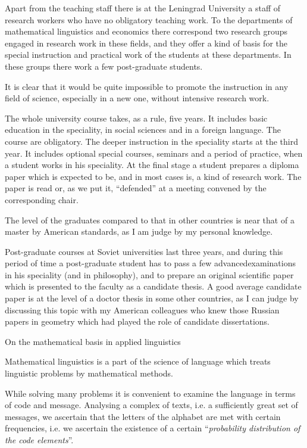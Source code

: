 Apart from the teaching staff there is at the Leningrad University a
staff of research workers who have no obligatory teaching work. To the
departments of mathematical linguistics and economics there correspond
two research groups engaged in research work in these fields, and they
offer a kind of basis for the special instruction and practical work
of the students at these departments. In these groups there work a few
post-graduate students.

It is clear that it would be quite impossible to promote the
instruction in any field of science, especially in a new one, without
intensive research work.

The whole university course takes, as a rule, five  years. It includes
basic education in the speciality, in social sciences and in a foreign
language. The course are obligatory. The deeper instruction in the
speciality starts at the third year. It includes optional special
courses, seminars and a period of practice, when a student works in
his speciality. At the final stage a student prepares a diploma paper
which is expected to be, and in most cases is, a kind of research
work. The paper is read or, as we put it, ``defended'' at a meeting
convened by the corresponding chair.

The level of the graduates compared to that in other countries is near
that of a master by American standards, as I am judge by my personal
knowledge.

Post-graduate courses at Soviet universities last three years, and
during this period of time a post-graduate student has to pass a few
advanced\pageoriginale examinations in his speciality (and in
philosophy), and to prepare an original scientific paper which is
presented to the faculty as a candidate thesis. A good average
candidate paper is at the level of a doctor thesis in some other
countries, as I can judge by discussing this topic with my American
colleagues who knew those Russian papers in geometry which had played
the role of candidate dissertations.

\begin{center}
On the mathematical basis in applied linguistics
\end{center}

Mathematical linguistics is a part of the science of language which
treats linguistic problems by mathematical methods.

While solving many problems it is convenient to examine the language
in terms of code and message. Analysing a complex of texts, i.e. a
sufficiently great set of messages, we ascertain that the letters of
the alphabet are met with certain frequencies, i.e. we ascertain the
existence of a certain ``\textit{probability distribution of the code
  elements}''.

